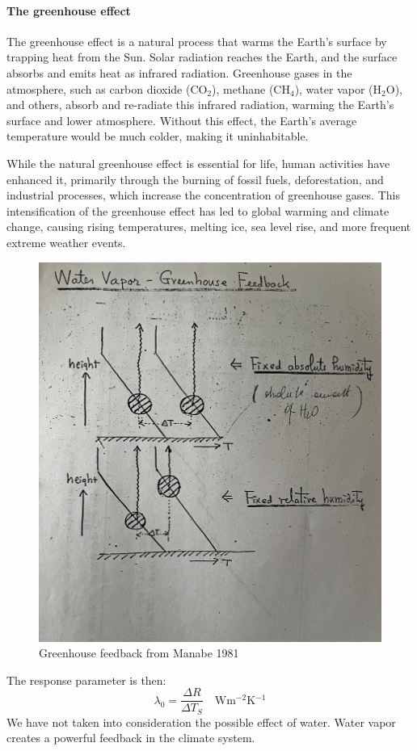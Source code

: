 \paragraph{The greenhouse effect}
The greenhouse effect is a natural process that warms the Earth’s surface by trapping heat from the Sun. Solar radiation reaches the Earth, and the surface absorbs and emits heat as infrared radiation. Greenhouse gases in the atmosphere, such as carbon dioxide (CO$_2$), methane (CH$_4$), water vapor (H$_2$O), and others, absorb and re-radiate this infrared radiation, warming the Earth's surface and lower atmosphere. Without this effect, the Earth's average temperature would be much colder, making it uninhabitable.

While the natural greenhouse effect is essential for life, human activities have enhanced it, primarily through the burning of fossil fuels, deforestation, and industrial processes, which increase the concentration of greenhouse gases. This intensification of the greenhouse effect has led to global warming and climate change, causing rising temperatures, melting ice, sea level rise, and more frequent extreme weather events.

\begin{figure}[h!]
	\centering
	\includegraphics[width=0.5\linewidth]{uploads/Screenshot 2024-11-24 203149.png}
	\caption{Greenhouse feedback from Manabe 1981}
	\label{fig:enter-label}
\end{figure}
The response parameter is then:
\begin{equation}
	\lambda_0=\frac{\Delta R}{\Delta T_S}\quad \text{Wm$^{-2}$K$^{-1}$}
\end{equation}
We have not taken into consideration the possible effect of water. Water vapor creates a powerful feedback in the climate system.
